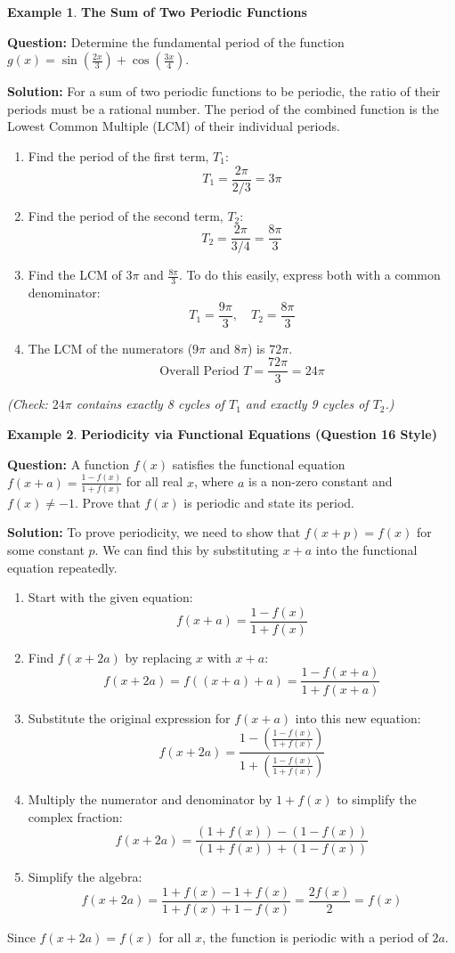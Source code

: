 \documentclass[12pt]{article}
\theoremstyle{definition}
\newtheorem{example}{Example}[section]
\begin{document}
\begin{example}
\textbf{The Sum of Two Periodic Functions}

\textbf{Question:} Determine the fundamental period of the function $g(x) = \sin\left(\frac{2x}{3}\right) + \cos\left(\frac{3x}{4}\right)$.

\textbf{Solution:}
For a sum of two periodic functions to be periodic, the ratio of their periods must be a rational number. The period of the combined function is the Lowest Common Multiple (LCM) of their individual periods.
\begin{enumerate}
  \item Find the period of the first term, $T_1$:
  \[
  T_1 = \frac{2\pi}{2/3} = 3\pi
  \]
  \item Find the period of the second term, $T_2$:
  \[
  T_2 = \frac{2\pi}{3/4} = \frac{8\pi}{3}
  \]
  \item Find the LCM of $3\pi$ and $\frac{8\pi}{3}$. To do this easily, express both with a common denominator:
  \[
  T_1 = \frac{9\pi}{3}, \quad T_2 = \frac{8\pi}{3}
  \]
  \item The LCM of the numerators ($9\pi$ and $8\pi$) is $72\pi$.
  \[
  \text{Overall Period } T = \frac{72\pi}{3} = 24\pi
  \]
\end{enumerate}
\textit{(Check: $24\pi$ contains exactly 8 cycles of $T_1$ and exactly 9 cycles of $T_2$.)}
\end{example}

\begin{example}
\textbf{Periodicity via Functional Equations (Question 16 Style)}

\textbf{Question:} A function $f(x)$ satisfies the functional equation $f(x+a) = \frac{1 - f(x)}{1 + f(x)}$ for all real $x$, where $a$ is a non-zero constant and $f(x) \neq -1$. Prove that $f(x)$ is periodic and state its period.

\textbf{Solution:}
To prove periodicity, we need to show that $f(x+p) = f(x)$ for some constant $p$. We can find this by substituting $x+a$ into the functional equation repeatedly.
\begin{enumerate}
  \item Start with the given equation:
  \[
  f(x+a) = \frac{1 - f(x)}{1 + f(x)}
  \]
  \item Find $f(x+2a)$ by replacing $x$ with $x+a$:
  \[
  f(x+2a) = f((x+a)+a) = \frac{1 - f(x+a)}{1 + f(x+a)}
  \]
  \item Substitute the original expression for $f(x+a)$ into this new equation:
  \[
  f(x+2a) = \frac{1 - \left( \frac{1 - f(x)}{1 + f(x)} \right)}{1 + \left( \frac{1 - f(x)}{1 + f(x)} \right)}
  \]
  \item Multiply the numerator and denominator by $1 + f(x)$ to simplify the complex fraction:
  \[
  f(x+2a) = \frac{(1 + f(x)) - (1 - f(x))}{(1 + f(x)) + (1 - f(x))}
  \]
  \item Simplify the algebra:
  \[
  f(x+2a) = \frac{1 + f(x) - 1 + f(x)}{1 + f(x) + 1 - f(x)} = \frac{2f(x)}{2} = f(x)
  \]
\end{enumerate}
Since $f(x+2a) = f(x)$ for all $x$, the function is periodic with a period of $2a$.
\end{example}
\end{document}
